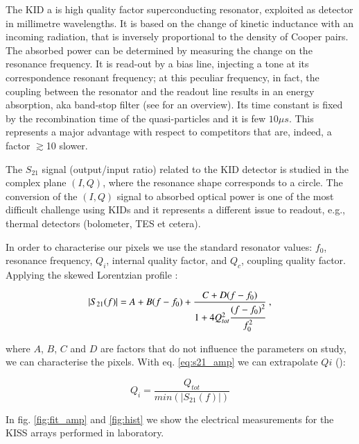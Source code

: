 \documentclass[twocolumn,traditabstract]{aa}\\
\begin{document}
The KID a is high quality factor superconducting resonator, exploited as detector in millimetre wavelengths. It is based on the change of kinetic inductance with an incoming radiation, that is inversely proportional to the density of Cooper pairs. The absorbed power can be determined by measuring the change on the resonance frequency.  It is read-out by a bias line, injecting a tone at its correspondence resonant frequency; at this peculiar frequency, in fact, the coupling between the resonator and the readout line results in an energy absorption, aka band-stop filter (see \cite{kids} for an overview). Its time constant is fixed by the recombination time of the quasi-particles and it is few $10 \mu s$. This represents a major advantage with respect to competitors that are, indeed, a factor $\gtrsim$10 slower.

The $S_{21}$ signal (output/input ratio) related to the KID detector is studied in the complex plane $(I,Q)$, where the resonance shape corresponds to a circle.
The conversion of the $(I,Q)$ signal to absorbed optical power is one of the most difficult challenge using KIDs and it represents a different issue to readout, e.g., thermal detectors (bolometer, TES et cetera).

In order to characterise our pixels we use the standard resonator values: $f_0$, resonance frequency, $Q_i$, internal quality factor, and $Q_c$, coupling quality factor. Applying the skewed Lorentzian profile \cite{Gao}:

\begin{equation}
\left|S_{21}(f)\right|= A+B(f-f_0)+\frac{C+D(f-f_0)}{1+4Q_{tot}^2\cfrac{(f-f_0)^2}{f_0^2}} \text{ ,}
\label{eq:s21_amp}
\end{equation}

\noindent where $A$, $B$, $C$ and $D$ are factors that do not influence the parameters on study, we can characterise the pixels. With eq. \ref{eq:s21_amp} we can extrapolate $Qi$ (\cite{Gao}):

\begin{equation}
Q_i =\frac{Q_{tot}}{min(\left|S_{21}(f)\right|)}
\end{equation}

In fig. \ref{fig:fit_amp} and \ref{fig:hist} we show the electrical measurements for the KISS arrays performed in laboratory.
\end{document}
